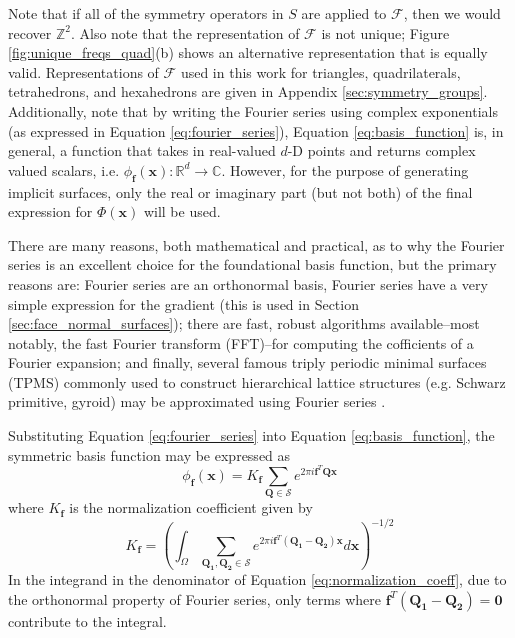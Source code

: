 \documentclass[acmtog]{acmart}
\begin{document}
%
Note that if all of the symmetry operators in $S$ are applied to $\mathcal{F}$, then we would recover $\mathbb{Z}^2$. Also note that the representation of $\mathcal{F}$ is not unique; Figure \ref{fig:unique_freqs_quad}(b) shows an alternative representation that is equally valid. Representations of $\mathcal{F}$ used in this work for triangles, quadrilaterals, tetrahedrons, and hexahedrons are given in Appendix \ref{sec:symmetry_groups}. Additionally, note that by writing the Fourier series using complex exponentials (as expressed in Equation \ref{eq:fourier_series}), Equation \ref{eq:basis_function} is, in general, a function that takes in real-valued $d$-D points and returns complex valued scalars, i.e. $\phi_{\mathbf{f}}(\mathbf{x}): \mathbb{R}^d \rightarrow \mathbb{C}$. However, for the purpose of generating implicit surfaces, only the real or imaginary part (but not both) of the final expression for $\Phi(\mathbf{x})$ will be used.

There are many reasons, both mathematical and practical, as to why the Fourier series is an excellent choice for the foundational basis function, but the primary reasons are: Fourier series are an orthonormal basis, Fourier series have a very simple expression for the gradient (this is used in Section \ref{sec:face_normal_surfaces}); there are fast, robust algorithms available--most notably, the fast Fourier transform (FFT)--for computing the cofficients of a Fourier expansion; and finally, several famous triply periodic minimal surfaces (TPMS) commonly used to construct hierarchical lattice structures (e.g. Schwarz primitive, gyroid) may be approximated using Fourier series \cite{wohlgemuth2001triply}.

Substituting Equation \ref{eq:fourier_series} into Equation \ref{eq:basis_function}, the symmetric basis function may be expressed as
%
\begin{equation}
  \label{eq:basis_function_actual}
  \phi_{\mathbf{f}}(\mathbf{x}) = K_{\mathbf{f}} \sum\limits_{\mathbf{Q} \in \mathcal{S}} e^{2 \pi i \mathbf{f}^T \mathbf{Q} \mathbf{x}}
\end{equation}
%
where $K_{\mathbf{f}}$ is the normalization coefficient given by
\begin{equation}
  \label{eq:normalization_coeff}
  K_{\mathbf{f}} = \left( \int_{\Omega}{ \sum\limits_{\mathbf{Q_1}, \mathbf{Q_2} \in \mathcal{S}} e^{2 \pi i \mathbf{f}^T (\mathbf{Q_1 - Q_2}) \mathbf{x}} d\mathbf{x} } \right)^{-1/2}
\end{equation}
In the integrand in the denominator of Equation \ref{eq:normalization_coeff}, due to the orthonormal property of Fourier series, only terms where $\mathbf{f}^T \left( \mathbf{Q_1} - \mathbf{Q_2} \right) = \mathbf{0}$ contribute to the integral.
\end{document}
